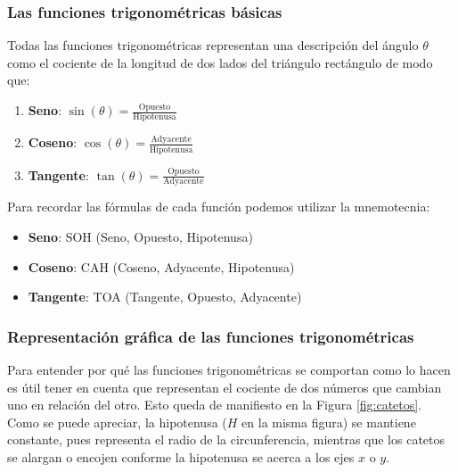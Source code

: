 \documentclass[
]{book}
\providecommand{\tightlist}{%
  \setlength{\itemsep}{0pt}\setlength{\parskip}{0pt}}
\begin{document}
\hypertarget{las-funciones-trigonomuxe9tricas-buxe1sicas}{%
\subsubsection{Las funciones trigonométricas básicas}\label{las-funciones-trigonomuxe9tricas-buxe1sicas}}

Todas las funciones trigonométricas representan una descripción del ángulo \(\theta\) como el cociente de la longitud de dos lados del triángulo rectángulo de modo que:

\begin{enumerate}
\def\labelenumi{\arabic{enumi}.}
\tightlist
\item
  \textbf{Seno}: \(\sin(\theta) = \frac{\mathrm{Opuesto}}{\mathrm{Hipotenusa}}\)
\item
  \textbf{Coseno}: \(\cos(\theta) = \frac{\mathrm{Adyacente}}{\mathrm{Hipotenusa}}\)
\item
  \textbf{Tangente}: \(\tan(\theta) = \frac{\mathrm{Opuesto}}{\mathrm{Adyacente}}\)
\end{enumerate}

Para recordar las fórmulas de cada función podemos utilizar la mnemotecnia:

\begin{itemize}
\tightlist
\item
  \textbf{Seno}: SOH (Seno, Opuesto, Hipotenusa)
\item
  \textbf{Coseno}: CAH (Coseno, Adyacente, Hipotenusa)
\item
  \textbf{Tangente}: TOA (Tangente, Opuesto, Adyacente)
\end{itemize}

\hypertarget{representaciuxf3n-gruxe1fica-de-las-funciones-trigonomuxe9tricas}{%
\subsubsection{Representación gráfica de las funciones trigonométricas}\label{representaciuxf3n-gruxe1fica-de-las-funciones-trigonomuxe9tricas}}

Para entender por qué las funciones trigonométricas se comportan como lo hacen es útil tener en cuenta que representan el cociente de dos números que cambian uno en relación del otro. Esto queda de manifiesto en la Figura \ref{fig:catetos}. Como se puede apreciar, la hipotenusa (\(H\) en la misma figura) se mantiene constante, pues representa el radio de la circunferencia, mientras que los catetos se alargan o encojen conforme la hipotenusa se acerca a los ejes \(x\) o \(y\).
\end{document}
